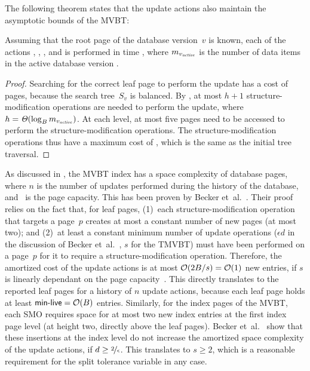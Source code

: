 The following theorem states that the update actions also maintain
the asymptotic bounds of the MVBT\@:

\thmskip
\begin{theorem}
\label{thm:tmvbt-update-cost}
Assuming that the root page of the database version~$v$ is known, 
each of the actions , , ,
and  is performed in time \OhT{\log_{\capacity}
\entries{\actver}}, where $m_{\smash{v_{\text{\textit{active}}}}}$ is the number of data items in
the active database version \actver.
\end{theorem}
\begin{proof}
Searching for the correct leaf page to perform the update has a cost of
\OhT{\log_{\capacity} \entries{\actver}} pages, because the search
tree~$S_v$ is balanced.
By , at most $h+1$ structure-modification
operations are needed to perform the update, where $h = \mathit{\Theta}(\log_{B}
m_{\smash{v_{\text{\textit{active}}}}})$.
At each level, at most five pages need to be accessed to perform the
structure-modification operations.
The structure-modification operations thus have a maximum cost of
\OhT{\log_\capacity \entries{\actver}}, which is the same as the initial tree
traversal.
\end{proof}
\thmskip

As discussed in , the MVBT index has a space
complexity of  database pages, where $n$ is the number of
updates performed during the history of the database, and \capacity\ is the
page capacity. 
This has been proven by Becker
et~al.~\cite{becker:1993:optimal,becker:1996:mvbt}.
Their proof relies on the fact that, for leaf pages,
(1)~each structure-modification operation that targets a page~$p$ creates at
most a constant number of new pages (at most two); and 
(2)~at least a constant minimum number of update operations ($\epsilon d$ in
the discussion of Becker et~al.~\cite{becker:1996:mvbt}, $s$ for the
TMVBT) must have been performed on a page~$p$ for it to require a
structure-modification operation.
Therefore, the amortized cost of the update actions is at most $\mathcal{O}(2
B/s) = \mathcal{O}(1)$ new entries, if $s$ is linearly dependant on the
page capacity~\capacity.
This directly translates to the reported  leaf pages for a
history of $n$ update actions, because each leaf page holds at least $\text{\textsf{min-live}}
= \mathcal{O}(B)$ entries.
Similarly, for the index pages of the MVBT, each SMO requires space for at most
two new index entries at the first index page level (at height two, directly
above the leaf pages). 
Becker et~al.~\cite{becker:1996:mvbt} show that these insertions at the
index level do not increase the amortized space complexity of the update
actions, if $d \geq \nicefrac{2}{\epsilon}$.
This translates to $s \geq 2$, which is a reasonable requirement for the
split tolerance variable in any case.
 
